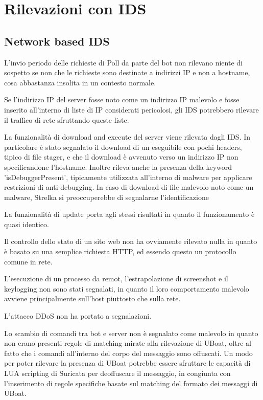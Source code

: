 \section{Rilevazioni con IDS}
\subsection{Network based IDS}
L'invio periodo delle richieste di Poll da parte del bot non rilevano niente  di sospetto se non che le richieste sono destinate a indirizzi IP e non a hostname, cosa abbastanza insolita in un contesto normale.

Se l'indirizzo IP del server fosse noto come un indirizzo IP malevolo e fosse inserito all'interno di liste di IP considerati pericolosi, gli IDS  potrebbero rilevare il traffico di rete sfruttando queste liste. 

\medskip

La funzionalità di download and execute del server viene rilevata dagli IDS. In particolare è stato segnalato il download di un eseguibile con pochi headers, tipico di file stager, e che il download è avvenuto verso un indirizzo IP non specificandone l'hostname. Inoltre rileva anche la presenza della keyword 'isDebuggerPresent', tipicamente utilizzata all'interno di malware per applicare restrizioni di anti-debugging.
In caso di download di file malevolo noto come un malware, Strelka si preoccuperebbe di segnalarne l'identificazione

La funzionalità di update porta agli stessi risultati in quanto il funzionamento è quasi identico.

\medskip

Il controllo dello stato di un sito web non ha ovviamente rilevato nulla in quanto è basato su una semplice richiesta HTTP, ed essendo questo un protocollo comune in rete.

\medskip
L'esecuzione di un processo da remot, l'estrapolazione di screenshot e il keylogging non sono stati segnalati, in quanto il loro comportamento malevolo avviene principalmente  sull'host piuttosto che sulla rete.

\medskip

L'attacco DDoS non ha portato a segnalazioni.

\medskip
Lo scambio di comandi tra bot e server non è segnalato come malevolo in quanto non erano presenti regole di matching mirate alla rilevazione di UBoat, oltre al fatto che i comandi all'interno del corpo del messaggio sono offuscati.
Un modo per poter rilevare la presenza di UBoat potrebbe essere sfruttare le capacità di LUA scripting di Suricata per deoffuscare il messaggio, in congiunta con l'inserimento di regole specifiche basate sul matching del formato dei messaggi di UBoat.

